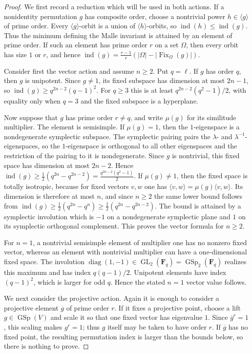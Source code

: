 \documentclass[11pt,hidelinks]{amsart}
\newcommand{\F}{\mathbf F}
\newcommand{\GL}{\operatorname{GL}}
\newcommand{\GSp}{\operatorname{GSp}}
\newcommand{\ind}{\operatorname{ind}}
\begin{document}
\begin{proof}
We first record a reduction which will be used in both actions.  If a
nonidentity permutation $g$ has composite order, choose a nontrivial
power $h\in\langle g\rangle$ of prime order.  Every
$\langle g\rangle$-orbit is a union of $\langle h\rangle$-orbits, so
$\ind(h)\leq\ind(g)$.  Thus the minimum defining the Malle invariant is
attained by an element of prime order.  If such an element has prime
order $r$ on a set $\Omega$, then every orbit has size $1$ or $r$, and hence $\ind(g)=\frac{r-1}{r}(|\Omega|-|\operatorname{Fix}_\Omega(g)|)$.

Consider first the vector action and assume $n\geq2$.  Put $q=\ell$.
If $g$ has order $q$, then $g$ is unipotent.  Since $g\neq1$, its fixed
subspace has dimension at most $2n-1$, so $\ind(g)\geq q^{2n-2}(q-1)^2$.
For $q\geq3$ this is at least
$q^{2n-2}(q^2-1)/2$, with equality only when $q=3$ and the fixed
subspace is a hyperplane.

Now suppose that $g$ has prime order $r\neq q$, and write $\mu(g)$ for
its similitude multiplier.  The element is semisimple.  If
$\mu(g)=1$, then the $1$-eigenspace is a nondegenerate symplectic
subspace. The symplectic pairing pairs the $\lambda$- and
$\lambda^{-1}$-eigenspaces, so the $1$-eigenspace is orthogonal to all
other eigenspaces and the restriction of the pairing to it is
nondegenerate.  Since $g$ is nontrivial, this fixed space has dimension at most $2n-2$. Hence $\ind(g)\geq \frac12(q^{2n}-q^{2n-2})=\frac{q^{2n-2}(q^2-1)}2$.
If $\mu(g)\neq1$, then the fixed space is totally isotropic, because
for fixed vectors $v,w$ one has
$\langle v,w\rangle=\mu(g)\langle v,w\rangle$.  Its dimension is therefore at most $n$, and since $n\geq2$ the same lower bound follows from $\ind(g)\geq\frac12(q^{2n}-q^n)\geq\frac12(q^{2n}-q^{2n-2})$.
The bound is attained by a symplectic involution which is $-1$ on a
nondegenerate symplectic plane and $1$ on its symplectic orthogonal
complement.  This proves the vector formula for $n\geq2$.

For $n=1$, a nontrivial semisimple element of multiplier one has no
nonzero fixed vector, whereas an element with nontrivial multiplier can
have a one-dimensional fixed space.  The involution
$\operatorname{diag}(1,-1)\in\GL_2(\F_q)=\GSp_2(\F_q)$ realizes this
maximum and has index $q(q-1)/2$.  Unipotent elements have index
$(q-1)^2$, which is larger for odd $q$.  Hence the stated $n=1$ vector
value follows.

We next consider the projective action.  Again it is enough to consider a
projective element $\overline g$ of prime order $r$.  If it fixes a
projective point, choose a lift $g\in\GSp(V)$ and scale it so that one
fixed vector has eigenvalue $1$.  Since $\overline g^r=1$, this scaling
makes $g^r=1$; thus $g$ itself may be taken to have order $r$.  If
$\overline g$ has no fixed point, the resulting permutation index is
larger than the bounds below, so there is nothing to prove.


\end{proof}
\end{document}
